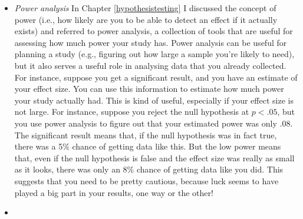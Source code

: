 \documentclass[
]{book}
\begin{document}
\begin{itemize}
\item
  \emph{Power analysis} In Chapter \ref{hypothesistesting} I discussed the concept of power (i.e., how likely are you to be able to detect an effect if it actually exists) and referred to power analysis, a collection of tools that are useful for assessing how much power your study has. Power analysis can be useful for planning a study (e.g., figuring out how large a sample you're likely to need), but it also serves a useful role in analysing data that you already collected. For instance, suppose you get a significant result, and you have an estimate of your effect size. You can use this information to estimate how much power your study actually had. This is kind of useful, especially if your effect size is not large. For instance, suppose you reject the null hypothesis at \(p<.05\), but you use power analysis to figure out that your estimated power was only \(.08\). The significant result means that, if the null hypothesis was in fact true, there was a 5\% chance of getting data like this. But the low power means that, even if the null hypothesis is false and the effect size was really as small as it looks, there was only an 8\% chance of getting data like you did. This suggests that you need to be pretty cautious, because luck seems to have played a big part in your results, one way or the other!
\item

\end{itemize}
\end{document}
